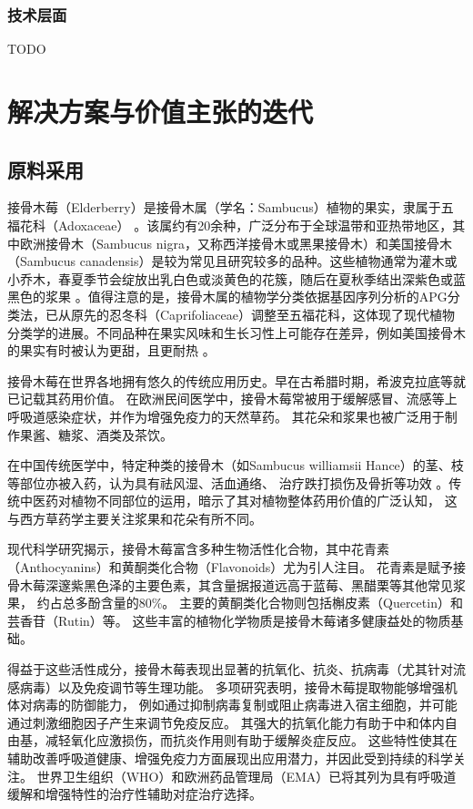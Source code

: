 \documentclass[12pt]{ctexart}
\begin{document}
\subsubsection{技术层面}
TODO
\section{解决方案与价值主张的迭代}
\subsection{原料采用}
接骨木莓（Elderberry）是接骨木属（学名：Sambucus）植物的果实，隶属于五福花科（Adoxaceae）\autocite{wiki_sambucus_2024} 。该属约有20余种，广泛分布于全球温带和亚热带地区，其中欧洲接骨木（Sambucus nigra，又称西洋接骨木或黑果接骨木）和美国接骨木（Sambucus canadensis）是较为常见且研究较多的品种\autocite{ucanr_elderplant_2021}。这些植物通常为灌木或小乔木，春夏季节会绽放出乳白色或淡黄色的花簇，随后在夏秋季结出深紫色或蓝黑色的浆果 。值得注意的是，接骨木属的植物学分类依据基因序列分析的APG分类法，已从原先的忍冬科（Caprifoliaceae）调整至五福花科，这体现了现代植物分类学的进展。不同品种在果实风味和生长习性上可能存在差异，例如美国接骨木的果实有时被认为更甜，且更耐热 。  

接骨木莓在世界各地拥有悠久的传统应用历史。早在古希腊时期，希波克拉底等就已记载其药用价值。
在欧洲民间医学中，接骨木莓常被用于缓解感冒、流感等上呼吸道感染症状，并作为增强免疫力的天然草药。
其花朵和浆果也被广泛用于制作果酱、糖浆、酒类及茶饮。

在中国传统医学中，特定种类的接骨木（如Sambucus williamsii Hance）的茎、枝等部位亦被入药，认为具有祛风湿、活血通络、
治疗跌打损伤及骨折等功效 。传统中医药对植物不同部位的运用，暗示了其对植物整体药用价值的广泛认知，
这与西方草药学主要关注浆果和花朵有所不同。  

现代科学研究揭示，接骨木莓富含多种生物活性化合物，其中花青素（Anthocyanins）和黄酮类化合物（Flavonoids）尤为引人注目。
花青素是赋予接骨木莓深邃紫黑色泽的主要色素，其含量据报道远高于蓝莓、黑醋栗等其他常见浆果，
约占总多酚含量的80\%\autocite{daiken_elderberry_nodate}。
主要的黄酮类化合物则包括槲皮素（Quercetin）和芸香苷（Rutin）等。
这些丰富的植物化学物质是接骨木莓诸多健康益处的物质基础。

得益于这些活性成分，接骨木莓表现出显著的抗氧化、抗炎、抗病毒（尤其针对流感病毒）以及免疫调节等生理功能\autocite{abed_elderberry_2023}。
多项研究表明，接骨木莓提取物能够增强机体对病毒的防御能力，
例如通过抑制病毒复制或阻止病毒进入宿主细胞，并可能通过刺激细胞因子产生来调节免疫反应。
其强大的抗氧化能力有助于中和体内自由基，减轻氧化应激损伤，而抗炎作用则有助于缓解炎症反应。
这些特性使其在辅助改善呼吸道健康、增强免疫力方面展现出应用潜力，并因此受到持续的科学关注。
世界卫生组织（WHO）和欧洲药品管理局（EMA）已将其列为具有呼吸道缓解和增强特性的治疗性辅助对症治疗选择。
\end{document}
